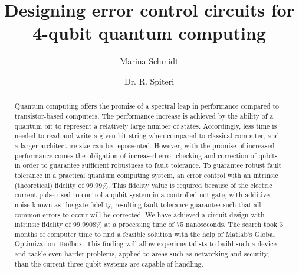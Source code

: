 \documentclass{article}
\title{Designing error control circuits for 4-qubit quantum computing}
\author[1]{Marina Schmidt}
\author[1]{Dr. R. Spiteri}
\affil[1]{Department of Computer Science, University of Saskatchewan}
\affil[ ]{Email: \textit {mts299@mail.usask.ca}}
\affil[ ]{NSID: mts299}
\begin{document}
\maketitle

\begin{abstract}

Quantum computing offers the promise of a spectral leap in performance compared to transistor-based computers. The performance increase is achieved by the ability of a quantum bit to represent a relatively large number of states. Accordingly, less time is needed to read and write a given bit string when compared to classical computer, and a larger architecture size can be represented. However, with the promise of increased performance comes the obligation of increased error checking and
    correction of qubits in order to guarantee sufficient robustness to fault tolerance. To guarantee robust fault tolerance in a practical quantum computing system, an error control with an intrinsic (theoretical) fidelity of $99.99\%$. 
%
This fidelity value is required because of the electric current pulse used to control a qubit system in a controlled not gate, with additive noise known as the gate fidelity, resulting fault tolerance guarantee such that all common errors to occur will be
    corrected. 
We have achieved a circuit design with intrinsic fidelity of $99.9908\%$ at a processing time of 75 nanoseconds. 
The search took 3 months of computer time to find a feasible solution with the help of Matlab's Global Optimization Toolbox. This finding will allow experimentalists to build such a device and tackle even harder problems, applied to areas such as networking and security, than the current three-qubit systems are capable of handling.

\end{abstract}
\end{document}
